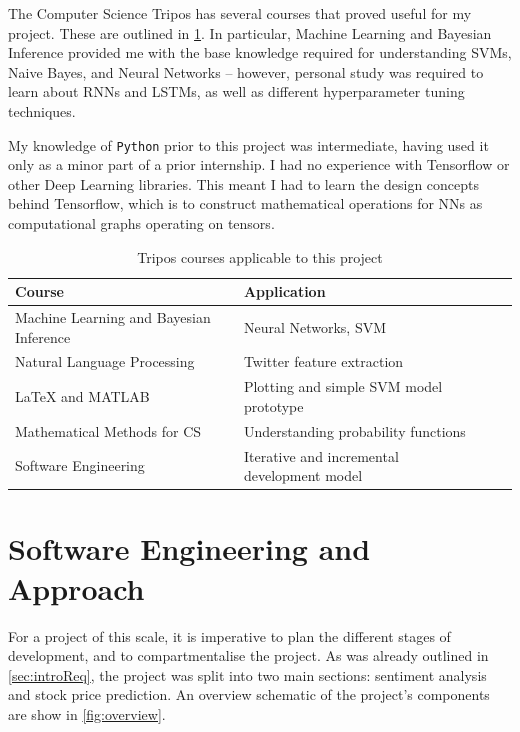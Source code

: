\documentclass[12pt,a4paper,twoside,openright]{report}
\begin{document}
The Computer Science Tripos has several courses that proved useful for my project.
These are outlined in \cref{table:courses}. In particular, Machine Learning and
Bayesian Inference provided me with the base knowledge required for understanding
SVMs, Naive Bayes, and Neural Networks -- however, personal study was required to
learn about RNNs and LSTMs, as well as different hyperparameter tuning techniques.

My knowledge of \texttt{Python} prior to this project was intermediate, having used it
only as a minor part of a prior internship. I had no experience with Tensorflow
or other Deep Learning libraries. This meant I had to learn the design concepts
behind Tensorflow, which is to construct mathematical operations for NNs as
computational graphs operating on tensors. 

\begin{table}[H]
\centering
\begin{tabular}{llll}
\toprule
\textbf{Course}                              & \textbf{Application} \\ \midrule
Machine Learning and Bayesian Inference      &  Neural Networks, SVM                    \\
Natural Language Processing                  &  Twitter feature extraction                    \\
LaTeX and MATLAB                             &  Plotting and simple SVM model prototype       \\
Mathematical Methods for CS    &  Understanding probability functions            \\
Software Engineering                         &  Iterative and incremental development model                    \\\bottomrule
\end{tabular}
\caption{Tripos courses applicable to this project}
\label{table:courses}
\end{table}

\section{Software Engineering and Approach}
\label{sec:introImpl}

For a project of this scale, it is imperative to plan the different stages of
development, and to compartmentalise the project. As was already outlined in \cref{sec:introReq},
the project was split into two main sections: sentiment analysis and stock price prediction. An
overview schematic of the project's components are show in \cref{fig:overview}.
\end{document}

